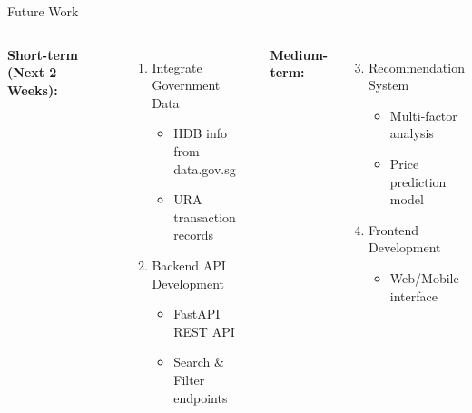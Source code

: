 \documentclass[aspectratio=169,10pt]{beamer}
\begin{document}
\begin{frame}{Future Work}
    \begin{columns}[T]
        \textbf{Short-term (Next 2 Weeks):}
        \begin{enumerate}
            \item Integrate Government Data
            \begin{itemize}
                \item HDB info from data.gov.sg
                \item URA transaction records
            \end{itemize}
            \item Backend API Development
            \begin{itemize}
                \item FastAPI REST API
                \item Search \& Filter endpoints
            \end{itemize}
        \end{enumerate}
        
        \textbf{Medium-term:}
        \begin{enumerate}
            \setcounter{enumi}{2}
            \item Recommendation System
            \begin{itemize}
                \item Multi-factor analysis
                \item Price prediction model
            \end{itemize}
            \item Frontend Development
            \begin{itemize}
                \item Web/Mobile interface
            \end{itemize}
        \end{enumerate}
    \end{columns}
    
    \vspace{0.6cm}
    
    \begin{center}
    \end{center}
\end{frame}
\end{document}

